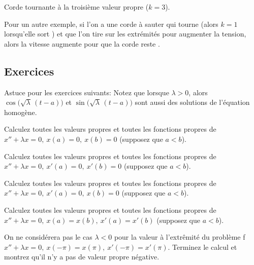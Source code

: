 \begin{myfig}
\capstart
{}
\caption{Corde tournante à la troisième valeur propre ($k=3$).\label{bvp:whirstring2fig}}
\end{myfig}

Pour un autre exemple, si l'on a une corde à sauter qui tourne (alors $k=1$ lorsqu'elle sort ) et que l'on tire sur les extrémités pour augmenter la tension, alors la vitesse augmente pour que la corde reste .
 

\subsection{Exercices}

Astuce pour les exercices suivants:  Notez que lorsque  $\lambda > 0$, alors
$\cos \bigl( \sqrt{\lambda}\, (t - a) \bigr)$
et $\sin  \bigl( \sqrt{\lambda}\, (t - a) \bigr)$
sont aussi des solutions de l'équation homogène. 

\begin{exercise}
Calculez toutes les valeurs propres et toutes les fonctions propres de 
$x'' + \lambda x = 0, ~ x(a) = 0, ~ x(b) = 0$ (supposez que $a < b$).
\end{exercise}

\begin{exercise}
Calculez toutes les valeurs propres et toutes les fonctions propres de 
$x'' + \lambda x = 0, ~ x'(a) = 0, ~ x'(b) = 0$ (supposez que $a < b$).
\end{exercise}

\begin{exercise}
Calculez toutes les valeurs propres et toutes les fonctions propres de 
$x'' + \lambda x = 0, ~ x'(a) = 0, ~ x(b) = 0$ (supposez que $a < b$).
\end{exercise}

\begin{exercise}
Calculez toutes les valeurs propres et toutes les fonctions propres de 
$x'' + \lambda x = 0, ~ x(a) = x(b), ~ x'(a) = x'(b)$ (supposez que $a < b$).
\end{exercise}

\begin{exercise}
On ne considérera pas le cas  $\lambda < 0$ pour la valeur à l'extrêmité du problème f
$x'' + \lambda x = 0, ~ x(-\pi) = x(\pi), ~ x'(-\pi) = x'(\pi)$.
Terminez le calcul et montrez qu'il n'y a pas de valeur propre négative. 
\end{exercise}

